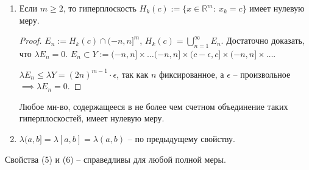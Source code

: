 \begin{properties}
\begin{enumerate}
{            \begin{proof}
                $0 = \lambda_m e = \inf \{ \sum_{j=1}^{\infty} \lambda P_j : \ P_j \in \mathcal{P}_{\mathbb{Q}^m} \ \land \ \bigcup_{j=1}^{\infty}P_j \supset e \}$, нарезаем $P_j$ на кубические ячейки.
            \end{proof}
        }
        \item {
            Если $m \geq 2$, то гиперплоскость $H_k(c) := \{ x \in \mathbb{R}^m : \ x_k = c \}$ имеет нулевую меру.

            \begin{proof}
                $E_n := H_k(c) \cap (-n, n]^m$, $H_k(c) = \bigcup_{n=1}^{\infty} E_n$. Достаточно доказать, что $\lambda E_n = 0$. $E_n \subset Y := (-n, n] \times \dots (-n, n] \times (c - \epsilon, c] \times (-n, n] \times \dots$.
                
                $\lambda E_n \leq \lambda Y = (2 n)^{m - 1} \cdot \epsilon$, так как $n$ фиксированное, а $\epsilon$ -- произвольное $\implies \lambda E_n = 0$.
            \end{proof}

            Любое мн-во, содержащееся в не более чем счетном объединение таких гиперплоскостей, имеет нулевую меру.
        }
        \item {
            $\lambda (a, b] = \lambda [a, b] = \lambda (a, b)$ -- по предыдущему свойству.
        }
    \end{enumerate}
\end{properties}

\begin{remark}
    Свойства (5) и (6) -- справедливы для любой полной меры.
\end{remark}

